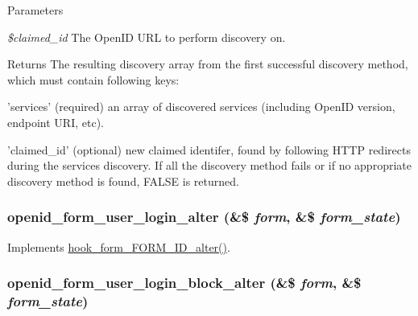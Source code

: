 \begin{DoxyParams}{Parameters}
\item[{\em \$claimed\_\-id}]The OpenID URL to perform discovery on.\end{DoxyParams}
\begin{DoxyReturn}{Returns}
The resulting discovery array from the first successful discovery method, which must contain following keys:
\begin{DoxyItemize}
\item 'services' (required) an array of discovered services (including OpenID version, endpoint URI, etc).
\item 'claimed\_\-id' (optional) new claimed identifer, found by following HTTP redirects during the services discovery. If all the discovery method fails or if no appropriate discovery method is found, FALSE is returned. 
\end{DoxyItemize}
\end{DoxyReturn}
\hypertarget{openid_8module_a0814fd0ed315219d49d117462946c6c3}{
\subsubsection[{openid\_\-form\_\-user\_\-login\_\-alter}]{\setlength{\rightskip}{0pt plus 5cm}openid\_\-form\_\-user\_\-login\_\-alter (\&\$ {\em form}, \/  \&\$ {\em form\_\-state})}}
\label{openid_8module_a0814fd0ed315219d49d117462946c6c3}
Implements \hyperlink{group__hooks_ga8d4a4089551493d55911bd5c4f218264}{hook\_\-form\_\-FORM\_\-ID\_\-alter()}. \hypertarget{openid_8module_a9820da9d7dabe2b3ef2e3e47af3d7a35}{
\subsubsection[{openid\_\-form\_\-user\_\-login\_\-block\_\-alter}]{\setlength{\rightskip}{0pt plus 5cm}openid\_\-form\_\-user\_\-login\_\-block\_\-alter (\&\$ {\em form}, \/  \&\$ {\em form\_\-state})}}
\label{openid_8module_a9820da9d7dabe2b3ef2e3e47af3d7a35}
